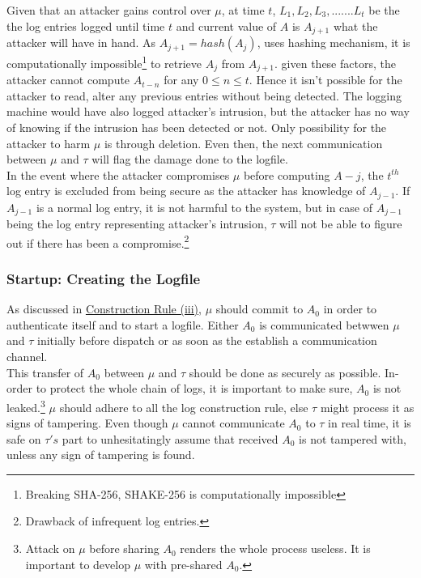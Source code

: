 \documentclass[12pt, letter]{article}
\begin{document}
Given that an attacker gains control over $\mu$, at time $t$, $L_1, L_2, L_3, ....... L_t$ be the the log entries logged until time $t$ and current value of $A$ is $A_{j+1}$ what the attacker will have in hand. As $A_{j+1} = hash(A_j)$, uses hashing mechanism, it is computationally impossible\footnote{Breaking SHA-256, SHAKE-256 is computationally impossible} to retrieve $A_j$ from $A_{j+1}$. given these factors, the attacker cannot compute $A_{t-n}$ for any $0 \leq n \leq t$. Hence it isn't possible for the attacker to read, alter any previous entries without being detected. The logging machine would have also logged attacker's intrusion, but the attacker has no way of knowing if the intrusion has been detected or not. Only possibility for the attacker to harm $\mu$ is through deletion. Even then, the next communication between $\mu$ and $\tau$ will flag the damage done to the logfile.\\


In the event where the attacker compromises $\mu$ before computing $A-j$, the $t^{th}$ log entry is excluded from being secure as the attacker has knowledge of $A_{j-1}$. If $A_{j-1}$ is a normal log entry, it is not harmful to the system, but in case of $A_{j-1}$ being the log entry representing attacker's intrusion, $\tau$ will not be able to figure out if there has been a compromise.\footnote{Drawback of infrequent log entries.}


\subsubsection{Startup: Creating the Logfile}

As discussed in \hyperref[sec:rules]{Construction Rule (iii)}, $\mu$ should commit to $A_0$ in order to authenticate itself and to start a logfile. Either $A_0$ is communicated betwwen $\mu$ and $\tau$ initially before dispatch or as soon as the establish a communication channel.\\


This transfer of $A_0$ between $\mu$ and $\tau$ should be done as securely as possible. In-order to protect the whole chain of logs, it is important to make sure, $A_0$ is not leaked.\footnote{Attack on $\mu$ before sharing $A_0$ renders the whole process useless. It is important to develop $\mu$ with pre-shared $A_0$.} $\mu$ should adhere to all the log construction rule, else $\tau$ might process it as signs of tampering. Even though $\mu$ cannot communicate $A_0$ to $\tau$ in real time, it is safe on $\tau's$ part to unhesitatingly assume that received $A_0$ is not tampered with, unless any sign of tampering is found.\\
\end{document}
